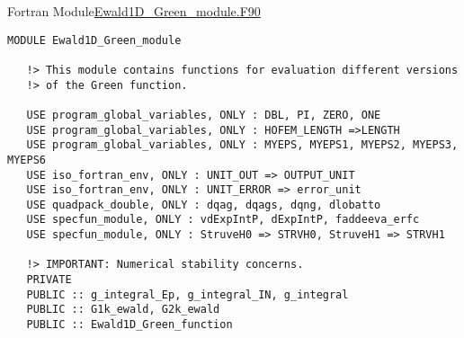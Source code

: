 \begin{frame}{Fortran Module}{\url{Ewald1D_Green_module.F90}}


  \begin{lstlisting}[style=myFORTRANcodeS]
MODULE Ewald1D_Green_module

   !> This module contains functions for evaluation different versions
   !> of the Green function.

   USE program_global_variables, ONLY : DBL, PI, ZERO, ONE
   USE program_global_variables, ONLY : HOFEM_LENGTH =>LENGTH
   USE program_global_variables, ONLY : MYEPS, MYEPS1, MYEPS2, MYEPS3, MYEPS6
   USE iso_fortran_env, ONLY : UNIT_OUT => OUTPUT_UNIT
   USE iso_fortran_env, ONLY : UNIT_ERROR => error_unit
   USE quadpack_double, ONLY : dqag, dqags, dqng, dlobatto 
   USE specfun_module, ONLY : vdExpIntP, dExpIntP, faddeeva_erfc
   USE specfun_module, ONLY : StruveH0 => STRVH0, StruveH1 => STRVH1

   !> IMPORTANT: Numerical stability concerns.
   PRIVATE
   PUBLIC :: g_integral_Ep, g_integral_IN, g_integral
   PUBLIC :: G1k_ewald, G2k_ewald
   PUBLIC :: Ewald1D_Green_function 

  \end{lstlisting}



\end{frame}



